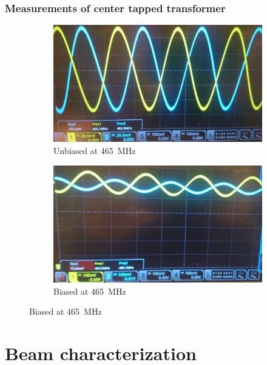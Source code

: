 \documentclass[aspectratio=169]{beamer}
\begin{document}
\begin{frame}
	\frametitle{Measurements of center tapped transformer}
	\begin{figure}[ht]
		\centering
		\begin{subfigure}{0.4\textwidth}
			\centering
			\includegraphics[width=\textwidth]{../Chapters/Deflection/unbiased3}
			\caption{Unbiased at \SI{465}{\mega\hertz}}
		\end{subfigure}
		\hspace{0.1\textwidth}
		\begin{subfigure}{0.4\textwidth}
			\centering
			\includegraphics[width=\textwidth]{../Chapters/Deflection/biased3}
			\caption{Biased at \SI{465}{\mega\hertz}}
		\end{subfigure}
	\end{figure}
\end{frame}

\section{Beam characterization}
\end{document}
